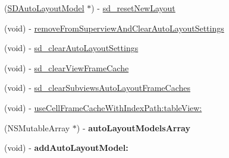 \begin{DoxyCompactItemize}
\item 
(\mbox{\hyperlink{interface_s_d_auto_layout_model}{S\+D\+Auto\+Layout\+Model}} $\ast$) -\/ \mbox{\hyperlink{category_u_i_view_07_s_d_auto_layout_08_a153c9536a475a6ea852e56f7bec9c4a9}{sd\+\_\+reset\+New\+Layout}}
\item 
(void) -\/ \mbox{\hyperlink{category_u_i_view_07_s_d_auto_layout_08_a0fb22a4dd54ef8a7be1a1e8e2f92787c}{remove\+From\+Superview\+And\+Clear\+Auto\+Layout\+Settings}}
\item 
(void) -\/ \mbox{\hyperlink{category_u_i_view_07_s_d_auto_layout_08_a0604c0bd6005c65aa163f700b8aec8d5}{sd\+\_\+clear\+Auto\+Layout\+Settings}}
\item 
(void) -\/ \mbox{\hyperlink{category_u_i_view_07_s_d_auto_layout_08_a52903f3c5267dfa7a517313f8ccf3ac4}{sd\+\_\+clear\+View\+Frame\+Cache}}
\item 
(void) -\/ \mbox{\hyperlink{category_u_i_view_07_s_d_auto_layout_08_afe494804af352201760acbd3226c6e54}{sd\+\_\+clear\+Subviews\+Auto\+Layout\+Frame\+Caches}}
\item 
(void) -\/ \mbox{\hyperlink{category_u_i_view_07_s_d_auto_layout_08_a50e23f4176d2c7be1acae226cdc58703}{use\+Cell\+Frame\+Cache\+With\+Index\+Path\+:table\+View\+:}}
\item 
\mbox{\label{category_u_i_view_07_s_d_auto_layout_08_a90d0de936dd3269d3fd3ed68051966ab}} 
(N\+S\+Mutable\+Array $\ast$) -\/ {\bfseries auto\+Layout\+Models\+Array}
\item 
\mbox{\label{category_u_i_view_07_s_d_auto_layout_08_aa41bfa2f4eef474014957d05c9b5b728}} 
(void) -\/ {\bfseries add\+Auto\+Layout\+Model\+:}
\end{DoxyCompactItemize}
